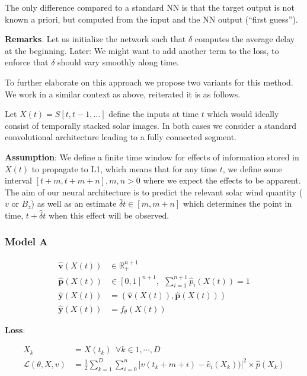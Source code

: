 \documentclass[]{article}
\theoremstyle{definition}
\begin{document}
The only difference compared to a standard NN is that the target output is not known a priori, but computed from the input and the NN output (``first guess''). 

\textbf{Remarks}. Let us initialize the network such that $\delta$ computes the average delay at the beginning. Later: We might want to add another term to the loss, to enforce that $\delta$ should vary smoothly along time.

To further elaborate on this approach we propose two variants for this method. We work in a similar context as above, reiterated it is as follows.

Let $X(t) = S[t, t-1, \ldots]$ define the inputs at time $t$ which would ideally consist of temporally stacked solar images. In both cases we consider a standard convolutional architecture leading to a fully connected segment.

\textbf{Assumption}: We define a finite time window for effects of information stored in $X(t)$ to propagate to L1, which means that for any time $t$, we define some interval $[t+m, t+m+n], m,n > 0$ where we expect the effects to be apparent. The aim of our neural architecture is to predict the relevant solar wind quantity ($v$ or $B_z$) as well as an estimate $\hat{\delta} t \in [m, m+n]$ which determines the point in time, $t+\hat{\delta} t$ when this effect will be observed.

\subsubsection*{Model A}

\begin{align*}
    \mathbf{\hat{v}}(X(t))  & \in \mathbb{R}_{+}^{n+1}\\
    \mathbf{\hat{p}}(X(t))  & \in [0, 1]^{n+1}, \ \ \sum_{i = 1}^{n+1}{\hat{p}_{i}(X(t))} = 1\\
    \mathbf{\hat{y}}(X(t))  & = (\mathbf{\hat{v}}(X(t)), \mathbf{\hat{p}}(X(t)))\\
    \mathbf{\hat{y}}(X(t))  & = f_{\theta}(X(t))
\end{align*}

\textbf{Loss}:

\begin{align*}
    X_{k}                     & = { X(t_{k}) } \ \ \forall k \in {1, \cdots, D} \\
    \mathcal{L}(\theta, X, v) & = \frac{1}{2} \sum_{k = 1}^{D}{\sum_{i = 0}^{n}{|v(t_{k}+m+i) - \hat{v}_{i}(X_k))|^{2} \times \hat{p}(X_{k})}}
\end{align*}
\end{document}
